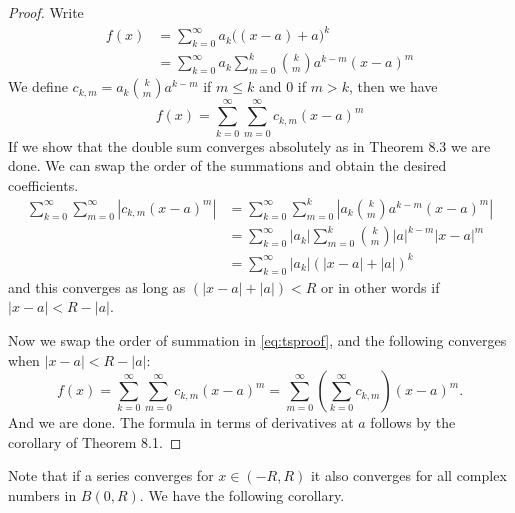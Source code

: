 \documentclass[12pt]{book}
\newcommand{\abs}[1]{\left\lvert {#1} \right\rvert}
\theoremstyle{plain}
\theoremstyle{remark}
\theoremstyle{definition}
\theoremstyle{exercise}
\theoremstyle{example}
\begin{document}
\begin{proof}
Write
\begin{equation*}
\begin{split}
f(x) &= \sum_{k=0}^\infty a_k {\bigl((x-a)+a\bigr)}^k \\
&= \sum_{k=0}^\infty a_k \sum_{m=0}^k \binom{k}{m} a^{k-m} {(x-a)}^m %
\end{split}
\end{equation*}
We define $c_{k,m} = a_k \binom{k}{m} a^{k-m}$ if $m \leq k$ and $0$ if $m >
k$, then we have
\begin{equation} \label{eq:tsproof}
f(x) = \sum_{k=0}^\infty \sum_{m=0}^\infty c_{k,m} {(x-a)}^m
\end{equation}
If we show that the double sum converges absolutely as in Theorem 8.3 we
are done.  We can swap the order of the summations and obtain the desired
coefficients.
\begin{equation*}
\begin{split}
\sum_{k=0}^\infty \sum_{m=0}^\infty \abs{ c_{k,m} {(x-a)}^m}
& = \sum_{k=0}^\infty \sum_{m=0}^k \abs{ a_k \binom{k}{m} a^{k-m} {(x-a)}^m }
\\
& = \sum_{k=0}^\infty \abs{a_k} \sum_{m=0}^k \binom{k}{m} \abs{a}^{k-m} {\abs{x-a}}^m  \\
& = \sum_{k=0}^\infty \abs{a_k} {(\abs{x-a}+\abs{a})}^k
\end{split}
\end{equation*}
and this converges as long as 
$(\abs{x-a}+\abs{a}) < R$ or in other words if
$\abs{x-a} < R-\abs{a}$.

Now we swap the order of summation in \eqref{eq:tsproof}, and 
the following converges when $\abs{x-a} < R-\abs{a}$:
\begin{equation*}
f(x) =
\sum_{k=0}^\infty \sum_{m=0}^\infty c_{k,m} {(x-a)}^m
=
\sum_{m=0}^\infty
\left( \sum_{k=0}^\infty
c_{k,m} \right) {(x-a)}^m .
\end{equation*}
And we are done.  The formula in terms of derivatives at $a$ follows by the
corollary of Theorem 8.1.
\end{proof}

\medskip

Note that if a series converges for $x \in (-R,R)$ it also converges
for all complex numbers in $B(0,R)$.
We have the following corollary.

\medskip
\end{document}
